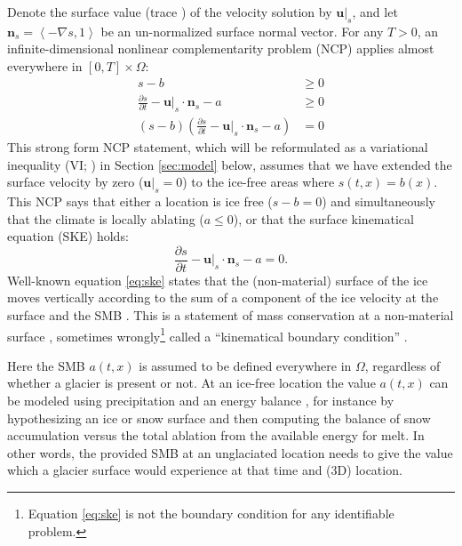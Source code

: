 \documentclass[hidelinks,onefignum,onetabnum,final]{siamart220329}  %
\newcommand{\grad}{\nabla}
\newcommand{\bn}{\mathbf{n}}
\newcommand{\bu}{\mathbf{u}}
\begin{document}
Denote the surface value (trace \cite{Evans2010}) of the velocity solution by $\bu|_s$, and let $\bn_s = \left<-\grad s,1\right>$ be an un-normalized surface normal vector.  For any $T>0$, an infinite-dimensional nonlinear complementarity problem (NCP) \cite{Bueler2021conservation,FacchineiPang2003,SchoofHewitt2013} applies almost everywhere in $[0,T]\times \Omega$:
\begin{subequations}
\label{eq:ncp}
\begin{align}
s - b &\ge 0 \\
\frac{\partial s}{\partial t} - \bu|_s \cdot \bn_s - a &\ge 0 \\
(s - b) \left(\frac{\partial s}{\partial t} - \bu|_s \cdot \bn_s - a\right) &= 0
\end{align}
\end{subequations}
This strong form NCP statement, which will be reformulated as a variational inequality (VI; \cite{KinderlehrerStampacchia1980}) in Section \ref{sec:model} below, assumes that we have extended the surface velocity by zero ($\bu|_s=0$) to the ice-free areas where $s(t,x)=b(x)$.  This NCP says that either a location is ice free ($s-b=0$) and simultaneously that the climate is locally ablating ($a\le 0$), or that the surface kinematical equation (SKE) holds:
\begin{equation}
\frac{\partial s}{\partial t} - \bu|_s \cdot \bn_s - a = 0.  \label{eq:ske}
\end{equation}
Well-known equation \eqref{eq:ske} states that the (non-material) surface of the ice moves vertically according to the sum of a component of the ice velocity at the surface and the SMB \cite{SchoofHewitt2013}.  This is a statement of mass conservation at a non-material surface \cite{Aschwandenetal2012}, sometimes wrongly\footnote{Equation \eqref{eq:ske} is not the boundary condition for any identifiable problem.} called a ``kinematical boundary condition'' \cite{GreveBlatter2009}.

Here the SMB $a(t,x)$ is assumed to be defined everywhere in $\Omega$, regardless of whether a glacier is present or not.  At an ice-free location the value $a(t,x)$ can be modeled using precipitation and an energy balance \cite{GreveBlatter2009}, for instance by hypothesizing an ice or snow surface and then computing the balance of snow accumulation versus the total ablation from the available energy for melt.  In other words, the provided SMB at an unglaciated location needs to give the value which a glacier surface would experience at that time and (3D) location.
\end{document}
